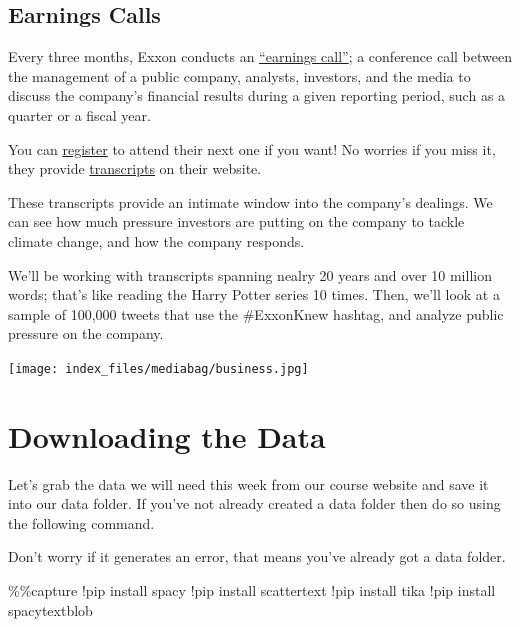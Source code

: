 \documentclass[
  letterpaper,
  DIV=11,
  numbers=noendperiod]{scrreprt}
\newenvironment{Shaded}{\begin{snugshade}}{\end{snugshade}}
\newcommand{\NormalTok}[1]{\textcolor[rgb]{0.00,0.23,0.31}{#1}}
\newcommand{\OperatorTok}[1]{\textcolor[rgb]{0.37,0.37,0.37}{#1}}
\begin{document}
\hypertarget{earnings-calls}{%
\subsection{Earnings Calls}\label{earnings-calls}}

Every three months, Exxon conducts an
\href{https://www.investopedia.com/terms/e/earnings-call.asp}{``earnings
call''}; a conference call between the management of a public company,
analysts, investors, and the media to discuss the company's financial
results during a given reporting period, such as a quarter or a fiscal
year.

You can
\href{https://globalmeet.webcasts.com/starthere.jsp?ei=1488251\&tp_key=440e363aaf}{register}
to attend their next one if you want! No worries if you miss it, they
provide
\href{https://corporate.exxonmobil.com/Investors/Investor-relations/Investor-materials-archive\#Quarterlyearningsmaterials}{transcripts}
on their website.

These transcripts provide an intimate window into the company's
dealings. We can see how much pressure investors are putting on the
company to tackle climate change, and how the company responds.

We'll be working with transcripts spanning nealry 20 years and over 10
million words; that's like reading the Harry Potter series 10 times.
Then, we'll look at a sample of 100,000 tweets that use the \#ExxonKnew
hashtag, and analyze public pressure on the company.

\texttt{[image: index\_files/mediabag/business.jpg]}

\hypertarget{downloading-the-data-1}{%
\section{Downloading the Data}\label{downloading-the-data-1}}

Let's grab the data we will need this week from our course website and
save it into our data folder. If you've not already created a data
folder then do so using the following command.

Don't worry if it generates an error, that means you've already got a
data folder.

\begin{Shaded}
\begin{Highlighting}[]
\OperatorTok{\%\%}\NormalTok{capture}
\OperatorTok{!}\NormalTok{pip install spacy}
\OperatorTok{!}\NormalTok{pip install scattertext}
\OperatorTok{!}\NormalTok{pip install tika}
\OperatorTok{!}\NormalTok{pip install spacytextblob}
\end{Highlighting}
\end{Shaded}
\end{document}
